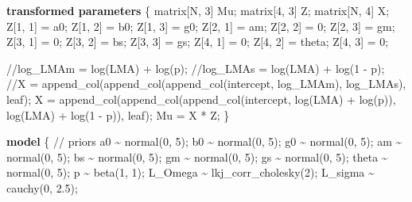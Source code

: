 \documentclass[
  12pt,
  letterpaper,
  DIV=11,
  numbers=noendperiod]{scrartcl}
\newenvironment{Shaded}{\begin{snugshade}}{\end{snugshade}}
\newcommand{\CommentTok}[1]{\textcolor[rgb]{0.37,0.37,0.37}{#1}}
\newcommand{\DataTypeTok}[1]{\textcolor[rgb]{0.68,0.00,0.00}{#1}}
\newcommand{\DecValTok}[1]{\textcolor[rgb]{0.68,0.00,0.00}{#1}}
\newcommand{\FloatTok}[1]{\textcolor[rgb]{0.68,0.00,0.00}{#1}}
\newcommand{\KeywordTok}[1]{\textcolor[rgb]{0.00,0.23,0.31}{\textbf{#1}}}
\newcommand{\NormalTok}[1]{\textcolor[rgb]{0.00,0.23,0.31}{#1}}
\numberwithin{equation}{section}
\begin{document}
\begin{Shaded}
\begin{Highlighting}[]
\KeywordTok{transformed parameters}\NormalTok{ \{}
  \DataTypeTok{matrix}\NormalTok{[N, }\DecValTok{3}\NormalTok{] Mu;}
  \DataTypeTok{matrix}\NormalTok{[}\DecValTok{4}\NormalTok{, }\DecValTok{3}\NormalTok{] Z;}
  \DataTypeTok{matrix}\NormalTok{[N, }\DecValTok{4}\NormalTok{] X;}
\NormalTok{  Z[}\DecValTok{1}\NormalTok{, }\DecValTok{1}\NormalTok{] = a0;}
\NormalTok{  Z[}\DecValTok{1}\NormalTok{, }\DecValTok{2}\NormalTok{] = b0;}
\NormalTok{  Z[}\DecValTok{1}\NormalTok{, }\DecValTok{3}\NormalTok{] = g0;}
\NormalTok{  Z[}\DecValTok{2}\NormalTok{, }\DecValTok{1}\NormalTok{] = am;}
\NormalTok{  Z[}\DecValTok{2}\NormalTok{, }\DecValTok{2}\NormalTok{] = }\DecValTok{0}\NormalTok{;}
\NormalTok{  Z[}\DecValTok{2}\NormalTok{, }\DecValTok{3}\NormalTok{] = gm;}
\NormalTok{  Z[}\DecValTok{3}\NormalTok{, }\DecValTok{1}\NormalTok{] = }\DecValTok{0}\NormalTok{;}
\NormalTok{  Z[}\DecValTok{3}\NormalTok{, }\DecValTok{2}\NormalTok{] = bs;}
\NormalTok{  Z[}\DecValTok{3}\NormalTok{, }\DecValTok{3}\NormalTok{] = gs;}
\NormalTok{  Z[}\DecValTok{4}\NormalTok{, }\DecValTok{1}\NormalTok{] = }\DecValTok{0}\NormalTok{;}
\NormalTok{  Z[}\DecValTok{4}\NormalTok{, }\DecValTok{2}\NormalTok{] = theta;}
\NormalTok{  Z[}\DecValTok{4}\NormalTok{, }\DecValTok{3}\NormalTok{] = }\DecValTok{0}\NormalTok{;}

  \CommentTok{//log\_LMAm = log(LMA) + log(p);}
  \CommentTok{//log\_LMAs = log(LMA) + log(1 {-} p);}
  \CommentTok{//X = append\_col(append\_col(append\_col(intercept, log\_LMAm), log\_LMAs), leaf);}
\NormalTok{  X = append\_col(append\_col(append\_col(intercept,}
\NormalTok{    log(LMA) + log(p)),}
\NormalTok{    log(LMA) + log(}\DecValTok{1}\NormalTok{ {-} p)),}
\NormalTok{    leaf);}
\NormalTok{  Mu = X * Z;}
\NormalTok{\}}

\KeywordTok{model}\NormalTok{ \{}
  \CommentTok{// priors}
\NormalTok{  a0 \textasciitilde{} normal(}\DecValTok{0}\NormalTok{, }\DecValTok{5}\NormalTok{);}
\NormalTok{  b0 \textasciitilde{} normal(}\DecValTok{0}\NormalTok{, }\DecValTok{5}\NormalTok{);}
\NormalTok{  g0 \textasciitilde{} normal(}\DecValTok{0}\NormalTok{, }\DecValTok{5}\NormalTok{);}
\NormalTok{  am \textasciitilde{} normal(}\DecValTok{0}\NormalTok{, }\DecValTok{5}\NormalTok{);}
\NormalTok{  bs \textasciitilde{} normal(}\DecValTok{0}\NormalTok{, }\DecValTok{5}\NormalTok{);}
\NormalTok{  gm \textasciitilde{} normal(}\DecValTok{0}\NormalTok{, }\DecValTok{5}\NormalTok{);}
\NormalTok{  gs \textasciitilde{} normal(}\DecValTok{0}\NormalTok{, }\DecValTok{5}\NormalTok{);}
\NormalTok{  theta \textasciitilde{} normal(}\DecValTok{0}\NormalTok{, }\DecValTok{5}\NormalTok{);}
\NormalTok{  p \textasciitilde{} beta(}\DecValTok{1}\NormalTok{, }\DecValTok{1}\NormalTok{);}
\NormalTok{  L\_Omega \textasciitilde{} lkj\_corr\_cholesky(}\DecValTok{2}\NormalTok{);}
\NormalTok{  L\_sigma \textasciitilde{} cauchy(}\DecValTok{0}\NormalTok{, }\FloatTok{2.5}\NormalTok{);}


\end{Highlighting}
\end{Shaded}
\end{document}
